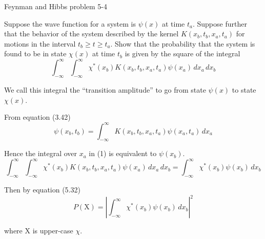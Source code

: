 \documentclass[12pt]{article}
\begin{document}
\begin{center}
Feynman and Hibbs problem 5-4
\end{center}

Suppose the wave function for a system is $\psi(x)$ at time $t_a$.
Suppose further that the behavior of the system described by
the kernel $K(x_b,t_b,x_a,t_a)$ for motions in the interval
$t_b\ge t\ge t_a$.
Show that the probability that the system is found to be in state
$\chi(x)$ at time $t_b$ is given by the square of the integral
\begin{equation*}
\int_{-\infty}^\infty\int_{-\infty}^\infty
\chi^*(x_b)
K(x_b,t_b,x_a,t_a)
\psi(x_a)
\,dx_a\,dx_b
\tag{1}
\end{equation*}

We call this integral the ``transition amplitude'' to go from
state $\psi(x)$ to state $\chi(x)$.

\bigskip
From equation (3.42)
\begin{equation*}
\psi(x_b,t_b)=\int_{-\infty}^\infty
K(x_b,t_b,x_a,t_a)
\psi(x_a,t_a)
\,dx_a
\end{equation*}

Hence the integral over $x_a$ in (1) is equivalent to $\psi(x_b)$.
\begin{equation*}
\int_{-\infty}^\infty\int_{-\infty}^\infty
\chi^*(x_b)
K(x_b,t_b,x_a,t_a)
\psi(x_a)
\,dx_a\,dx_b
=\int_{-\infty}^\infty
\chi^*(x_b)
\psi(x_b)
\,dx_b
\end{equation*}

Then by equation (5.32)
\begin{equation*}
P(\mathrm X)=\left|
\int_{-\infty}^\infty
\chi^*(x_b)
\psi(x_b)
\,dx_b
\right|^2
\end{equation*}

where $\mathrm X$ is upper-case $\chi$.
\end{document}
